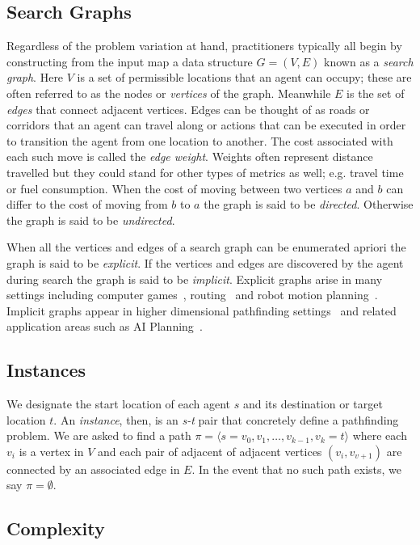 \subsection{Search Graphs}
\label{cha::lit::problem::graphs}
Regardless of the problem variation at hand, practitioners typically all begin
by constructing from the input map a data structure $G = (V, E)$ known as a
\emph{search graph}.  Here $V$ is a set of permissible locations that an agent
can occupy; these are often referred to as the nodes or \emph{vertices} of the
graph.  Meanwhile $E$ is the set of \emph{edges} that connect adjacent vertices.
Edges can be thought of as roads or corridors that an agent can travel along or
actions that can be executed in order to transition the agent from one location
to another.  The cost associated with each such move is called the \emph{edge
weight}.  Weights often represent distance travelled but they could stand for
other types of metrics as well; e.g.  travel time or fuel consumption.  When the
cost of moving between two vertices $a$ and $b$ can differ to the cost of moving
from $b$ to $a$ the graph is said to be \emph{directed}.  Otherwise 
the graph is said to be \emph{undirected}.

When all the vertices and edges of a search graph can be enumerated apriori the
graph is said to be \emph{explicit}. If the vertices and edges are discovered
by the agent during search the graph is said to be \emph{implicit}.
Explicit graphs arise in many settings including computer 
games~\citep{davis00,tozour02,champandard09},
routing~\citep{sanders05,goldberg06} and robot motion
planning~\citep{latombe91,choset05}.  Implicit graphs appear in higher
dimensional pathfinding settings~\citep{lavalle98,bohlin00} and related
application areas such as AI Planning~\citep{russel03}.

\subsection{Instances}
\label{cha::lit::problem::instance}
We designate the start location of each agent $s$ and its destination or 
target location $t$. An \emph{instance}, then, is an \emph{s-t} pair that
concretely define a pathfinding problem. We are asked to find a path
$\pi = \langle  s = v_0, v_1, \ldots, v_{k-1},  v_k = t\rangle$ where each $v_i$
is a vertex in $V$ and each pair of adjacent of adjacent vertices $(v_i, v_{v+1})$ 
are connected by an associated edge in $E$.
In the event that no such path exists, we say $\pi = \emptyset$.

\subsection{Complexity}
\label{cha::lit::problem::complexity}

